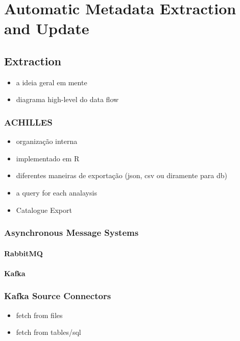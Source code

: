 \chapter{Automatic Metadata Extraction and Update}
\label{chapter:metadata-visualization}

\section{Extraction}

\begin{itemize}
    \item a ideia geral em mente
    \item diagrama high-level do data flow
\end{itemize}

\subsection{ACHILLES}
\begin{itemize}
    \item organização interna
    \item implementado em R
    \item diferentes maneiras de exportação (json, csv ou diramente para db)
    \item a query for each analaysis
    \item Catalogue Export
\end{itemize}

\subsection{Asynchronous Message Systems}

\subsubsection{RabbitMQ}

\subsubsection{Kafka}


\subsection{Kafka Source Connectors}
\begin{itemize}
    \item fetch from files
    \item fetch from tables/sql
\end{itemize}

